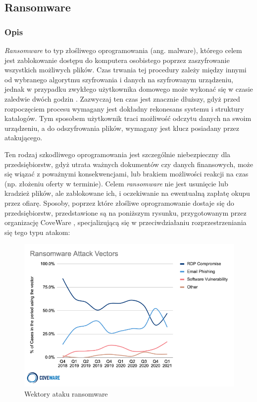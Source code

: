 \documentclass[12pt,twoside]{article}
\begin{document}
\clearpage

\subsection{Ransomware}
\subsubsection{Opis}
\emph{Ransomware} to typ złośliwego oprogramowania (ang. malware), którego celem jest zablokowanie dostępu do komputera osobistego poprzez zaszyfrowanie wszystkich możliwych plików. Czas trwania tej procedury zależy między innymi od wybranego algorytmu szyfrowania i danych na szyfrowanym urządzeniu, jednak w przypadku zwykłego użytkownika domowego może wykonać się w czasie zaledwie dwóch godzin \cite{RansomwareTime}. Zazwyczaj ten czas jest znacznie dłuższy, gdyż przed rozpoczęciem procesu wymagany jest dokładny rekonesans systemu i struktury katalogów. Tym sposobem użytkownik traci możliwość odczytu danych na swoim urządzeniu, a do odszyfrowania plików, wymagany jest klucz posiadany przez atakującego. 

Ten rodzaj szkodliwego oprogramowania jest szczególnie niebezpieczny dla przedsiębiorstw, gdyż utrata ważnych dokumentów czy danych finansowych, może się wiązać z poważnymi konsekwencjami, lub brakiem możliwości reakcji na czas (np. złożeniu oferty w terminie). Celem \emph{ransomware} nie jest usunięcie lub kradzież plików, ale zablokowane ich, i oczekiwanie na ewentualną zapłatę okupu przez ofiarę. Sposoby, poprzez które złośliwe oprogramowanie dostaje się do przedsiębiorstw, przedstawione są na poniższym rysunku, przygotowanym przez organizację CoveWare \cite{RansomwareAttackVectors}, specjalizującą się w przeciwdziałaniu rozprzestrzeniania się tego typu atakom:
\begin{figure}[H]
	\centering
	\includegraphics[width=0.75\linewidth]{figures/ransomware-attack-vectors.png}
	\caption{Wektory ataku ransomware}
	\label{Fig:Wektory ataku ransomware}
\end{figure} 
\end{document}
